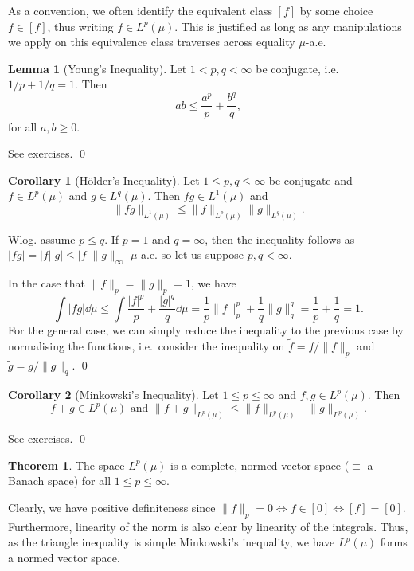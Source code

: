 \documentclass[
]{article}
\theoremstyle{definition}
\newtheorem{theorem}{Theorem}
\newtheorem{corollary}{Corollary}[theorem]
\theoremstyle{definition}
\newtheorem{lemma}{Lemma}[section]
\begin{document}
As a convention, we often identify the equivalent class \([f]\) by some
choice \(f \in [f]\), thus writing \(f \in L^p(\mu)\). This is justified
as long as any manipulations we apply on this equivalence class
traverses across equality \(\mu\)-a.e.

\begin{lemma}[Young's Inequality]
  Let \(1 < p, q < \infty\) be conjugate, i.e. \(1 / p + 1 / q = 1\). Then 
  \[ab \le \frac{a^p}{p} + \frac{b^q}{q},\]
  for all \(a, b \ge 0\).
\end{lemma}
\proof

See exercises. \qed

\begin{corollary}[Hölder's Inequality]
  Let \(1 \le p, q \le \infty\) be conjugate and \(f \in L^p(\mu)\) and \(g \in L^q(\mu)\). 
  Then \(fg \in L^1(\mu)\) and 
  \[\|fg\|_{L^1(\mu)} \le \|f\|_{L^p(\mu)} \|g\|_{L^q(\mu)}.\]
\end{corollary}
\proof

Wlog. assume \(p \le q\). If \(p = 1\) and \(q = \infty\), then the
inequality follows as \(|fg| = |f| |g| \le |f|\|g\|_\infty\)
\(\mu\)-a.e. so let us suppose \(p, q < \infty\).

In the case that \(\|f\|_p = \|g\|_p = 1\), we have
\[\int |fg| \dd \mu \le \int \frac{|f|^p}{p} + \frac{|g|^q}{q} \dd \mu
    = \frac{1}{p} \|f\|^p_p + \frac{1}{q} \|g\|^q_q = \frac{1}{p} + \frac{1}{q} = 1.\]
For the general case, we can simply reduce the inequality to the
previous case by normalising the functions, i.e.~consider the inequality
on \(\tilde f = f / \|f\|_p\) and \(\tilde g = g / \|g\|_q\). \qed

\begin{corollary}[Minkowski's Inequality]
  Let \(1 \le p \le \infty\) and \(f, g \in L^p(\mu)\). Then 
  \[f + g \in L^p(\mu) \text{ and } \|f + g\|_{L^p(\mu)} \le 
    \|f\|_{L^p(\mu)} + \|g\|_{L^p(\mu)}.\]
\end{corollary}
\proof

See exercises. \qed

\begin{theorem}
  The space \(L^p(\mu)\) is a complete, normed vector space (\(\equiv\) a Banach space) 
  for all \(1 \le p \le \infty\).
\end{theorem}
\proof

Clearly, we have positive definiteness since
\(\|f\|_p = 0 \iff f \in [0] \iff  [f] = [0]\). Furthermore, linearity
of the norm is also clear by linearity of the integrals. Thus, as the
triangle inequality is simple Minkowski's inequality, we have
\(L^p(\mu)\) forms a normed vector space.
\end{document}
